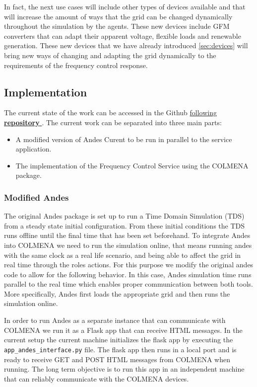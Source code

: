 \documentclass{article}
\begin{document}
In fact, the next use cases will include other types of devices available and that will increase the amount of ways that the grid can be changed dynamically throughout the simulation by the agents. These new devices include GFM converters that can adapt their apparent voltage, flexible loads and renewable generation. These new devices that we have already introduced \ref{sec:devices} will bring new ways of changing and adapting the grid dynamically to the requirements of the frequency control response.
\subsection{Implementation}

The current state of the work can be accessed in the Github \href{https://github.com/eRoots-Analytics/COLMENA}{ following \textbf{repository} } \cite{git:eroots}. The current work can be separated into three main parts:

\begin{itemize}
    \item A modified version of Andes Curent to be run in parallel to the service application.
    \item The implementation of the Frequency Control Service using the COLMENA package.
\end{itemize}



\subsubsection{Modified Andes}

The original Andes package is set up to run a Time Domain Simulation (TDS) from a steady state initial configuration. From these initial conditions the TDS runs offline until the final time that has been set beforehand. To integrate Andes into COLMENA we need to run the simulation online, that means running andes with the same clock as a real life scenario, and being able to affect the grid in real time through the roles actions. For this purpose we modify the original andes code to allow for the following behavior. In this case, Andes simulation time runs parallel to the real time which enables proper communication between both tools. More specifically, Andes first loads the appropriate grid and then runs the simulation online.  

In order to run Andes as a separate instance that can communicate with COLMENA we run it as a Flask app that can receive HTML messages. In the current setup the current machine initializes the flask app by executing the \texttt{app\_andes\_interface.py} file. The flask app then runs in a local port and is ready to receive GET and POST HTML messages from COLMENA when running. The long term objective is to run this app in an independent machine that can reliably communicate with the COLMENA devices.
\end{document}
